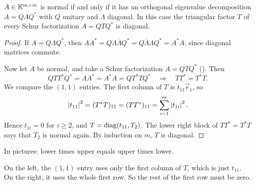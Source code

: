 \begin{theorem}
  \label{thm:normal-diag}
  $A \in \mathbb{K}^{m \times m}$ is normal if and only if it has an orthogonal eigenvalue decomposition $A = Q\Lambda Q^\ast$ with $Q$ unitary and $\Lambda$ diagonal. In this case the triangular factor $T$ of every Schur factorization $A = QTQ^\ast$ is diagonal.
\end{theorem}

\begin{proof}
  If $A = Q\Lambda Q^\ast$, then $AA^\ast = Q\Lambda\overline{\Lambda}Q^\ast = Q\overline{\Lambda}\Lambda Q^\ast = A^\ast A$, since diagonal matrices commute.

  Now let $A$ be normal, and take a Schur factorization $A = QTQ^\ast$ (). Then
  \begin{equation}
    QTT^\ast Q^\ast = AA^\ast = A^\ast A = QT^\ast TQ^\ast \quad\Longrightarrow\quad TT^\ast = T^\ast T.
  \end{equation}
  We compare the $(1,1)$ entries. The first column of $T$ is $t_{11}\vec{e}_1$, so
  \begin{equation}
    \left\lvert t_{11} \right\rvert^2 = (T^\ast T)_{11} = (TT^\ast)_{11} = \sum_{i=1}^m\left\lvert t_{1i} \right\rvert^2.
  \end{equation}
  Hence $t_{1i} = 0$ for $i \ge 2$, and $T = \operatorname{diag}(t_{11}, T_2)$. The lower right block of $TT^\ast = T^\ast T$ says that $T_2$ is normal again. By induction on $m$, $T$ is diagonal.
\end{proof}

In pictures: lower times upper equals upper times lower.
\begin{center}
\end{center}
On the left, the $(1,1)$ entry uses only the first column of $T$, which is just $t_{11}$. On the right, it uses the whole first row. So the rest of the first row must be zero.

